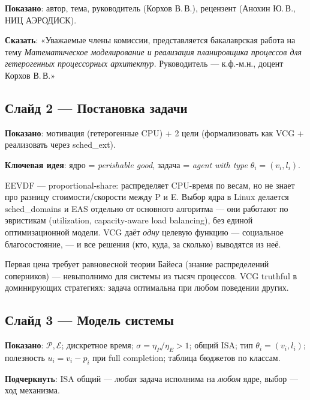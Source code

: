 \documentclass[11pt,a4paper]{article}
\begin{document}
\textbf{Показано}: автор, тема, руководитель (Корхов В.\,В.), рецензент
(Анохин Ю.\,В., НИЦ АЭРОДИСК).

\textbf{Сказать}: «Уважаемые члены комиссии, представляется
бакалаврская работа на тему \emph{Математическое моделирование и
реализация планировщика процессов для гетерогенных процессорных
архитектур}. Руководитель — к.ф.-м.н., доцент Корхов В.\,В.»

\subsection*{Слайд 2 — Постановка задачи}

\textbf{Показано}: мотивация (гетерогенные CPU) + 2 цели
(формализовать как VCG + реализовать через sched\_ext).

\textbf{Ключевая идея}: ядро = \emph{perishable good}, задача =
\emph{agent with type} $\theta_i=(v_i,l_i)$.

\begin{ask}
EEVDF — proportional-share: распределяет CPU-время по весам, но не
знает про разницу стоимости/скорости между P и E. Выбор ядра в Linux
делается sched\_domains и EAS отдельно от основного алгоритма — они
работают по эвристикам (utilization, capacity-aware load balancing),
без единой оптимизационной модели. VCG даёт \emph{одну} целевую
функцию — социальное благосостояние, — и все решения (кто, куда, за
сколько) выводятся из неё.
\end{ask}

\begin{ask}
Первая цена требует равновесной теории Байеса (знание распределений
соперников) — невыполнимо для системы из тысяч процессов. VCG truthful
в доминирующих стратегиях: задача оптимальна при любом поведении
других.
\end{ask}

\subsection*{Слайд 3 — Модель системы}

\textbf{Показано}: $\mathcal{P}, \mathcal{E}$; дискретное время;
$\sigma=\eta_P/\eta_E>1$; общий ISA; тип $\theta_i=(v_i,l_i)$;
полезность $u_i=v_i-p_i$ при full completion; таблица бюджетов по
классам.

\textbf{Подчеркнуть}: ISA общий — \emph{любая} задача исполнима на
\emph{любом} ядре, выбор — ход механизма.
\end{document}
